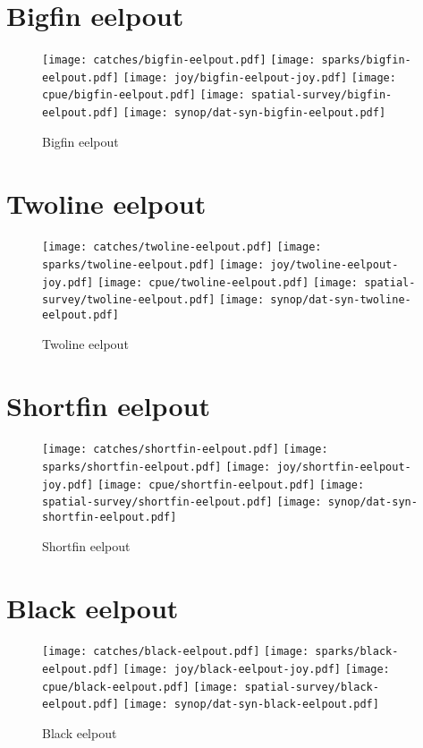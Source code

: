 \section*{Bigfin eelpout}

\begin{figure}[htbp]
\centering
\texttt{[image: catches/bigfin-eelpout.pdf]}
\texttt{[image: sparks/bigfin-eelpout.pdf]}
\texttt{[image: joy/bigfin-eelpout-joy.pdf]}
\texttt{[image: cpue/bigfin-eelpout.pdf]}
\texttt{[image: spatial-survey/bigfin-eelpout.pdf]}
\texttt{[image: synop/dat-syn-bigfin-eelpout.pdf]}
\caption{Bigfin eelpout}
\end{figure}
\clearpage
\section*{Twoline eelpout}

\begin{figure}[htbp]
\centering
\texttt{[image: catches/twoline-eelpout.pdf]}
\texttt{[image: sparks/twoline-eelpout.pdf]}
\texttt{[image: joy/twoline-eelpout-joy.pdf]}
\texttt{[image: cpue/twoline-eelpout.pdf]}
\texttt{[image: spatial-survey/twoline-eelpout.pdf]}
\texttt{[image: synop/dat-syn-twoline-eelpout.pdf]}
\caption{Twoline eelpout}
\end{figure}
\clearpage
\section*{Shortfin eelpout}

\begin{figure}[htbp]
\centering
\texttt{[image: catches/shortfin-eelpout.pdf]}
\texttt{[image: sparks/shortfin-eelpout.pdf]}
\texttt{[image: joy/shortfin-eelpout-joy.pdf]}
\texttt{[image: cpue/shortfin-eelpout.pdf]}
\texttt{[image: spatial-survey/shortfin-eelpout.pdf]}
\texttt{[image: synop/dat-syn-shortfin-eelpout.pdf]}
\caption{Shortfin eelpout}
\end{figure}
\clearpage
\section*{Black eelpout}

\begin{figure}[htbp]
\centering
\texttt{[image: catches/black-eelpout.pdf]}
\texttt{[image: sparks/black-eelpout.pdf]}
\texttt{[image: joy/black-eelpout-joy.pdf]}
\texttt{[image: cpue/black-eelpout.pdf]}
\texttt{[image: spatial-survey/black-eelpout.pdf]}
\texttt{[image: synop/dat-syn-black-eelpout.pdf]}
\caption{Black eelpout}
\end{figure}
\clearpage
